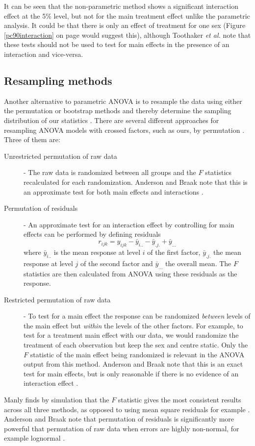 It can be seen that the non-parametric method shows a significant interaction effect at the 5\% level, but not for the main treatment effect unlike the parametric analysis. It could be that there is only an effect of treatment for one sex (Figure \ref{pc90interaction} on page \pageref{pc90interaction} would suggest this), although Toothaker \textit{et al.} \cite{toothaker} note that these tests should not be used to test for main effects in the presence of an interaction and vice-versa.

\subsection{Resampling methods}\label{section:resampling}
Another alternative to parametric ANOVA is to resample the data using either the permutation or bootstrap methods and thereby determine the sampling distribution of our statistics \cite{manly}. There are several different approaches for resampling ANOVA models with crossed factors, such as ours, by permutation \cite{manly, anderson}. Three of them are:
\begin{description}
\item[Unrestricted permutation of raw data] - The raw data is randomized between all groups and the $F$ statistics recalculated for each randomization. Anderson and Braak note that this is an approximate test for both main effects and interactions \cite{anderson}.
\item[Permutation of residuals] - An approximate test for an interaction effect by controlling for main effects can be performed by defining residuals
$$r_{ijk}=y_{ijk}-\bar{y}_{i..}-\bar{y}_{.j.}+\bar{y}_{...}$$
where $\bar{y}_{i..}$ is the mean response at level $i$ of the first factor, $\bar{y}_{.j.}$ the mean response at level $j$ of the second factor and $\bar{y}_{...}$ the overall mean. The $F$ statistics are then calculated from ANOVA using these residuals as the response.
\item[Restricted permutation of raw data] - To test for a main effect the response can be randomized \emph{between} levels of the main effect but \emph{within} the levels of the other factors. For example, to test for a treatment main effect with our data, we would randomize the treatment of each observation but keep the sex and centre static. Only the $F$ statistic of the main effect being randomized is relevant in the ANOVA output from this method. Anderson and Braak note that this is an exact test for main effects, but is only reasonable if there is no evidence of an interaction effect \cite{anderson}.
\end{description}
Manly finds by simulation that the $F$ statistic gives the most consistent results across all three methods, as opposed to using mean square residuals for example \cite{manly}. Anderson and Braak note that permutation of residuals is significantly more powerful that permutation of raw data when errors are highly non-normal, for example lognormal \cite{anderson}.

